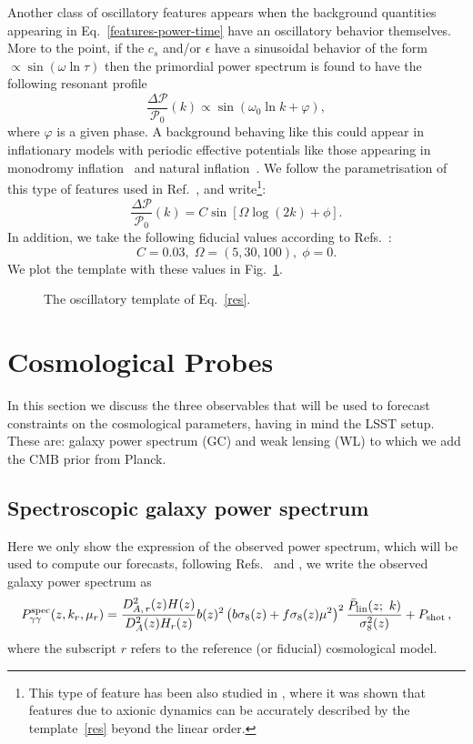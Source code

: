 \documentclass[12pt]{article}
\newcommand{\be}{\begin{equation}}
\newcommand{\ee}{\end{equation}}
\begin{document}
Another class of oscillatory features appears when the background quantities appearing in Eq.~\eqref{features-power-time} have an oscillatory behavior themselves. More to the point, if the $c_s$ and/or $\epsilon$ have a sinusoidal behavior of the form $\propto \sin (\omega \ln \tau)$ then the primordial power spectrum is found to have the following resonant profile
\be
\frac{\Delta \mathcal P}{\mathcal P_0 } (k)  \propto  \sin ( \omega_0 \ln k + \varphi ) ,
\ee
where $\varphi$ is a given phase. A background behaving like this could appear in inflationary models with periodic effective potentials like those appearing in monodromy inflation~\cite{McAllister:2008hb} and natural inflation~\cite{Freese:1990rb}. We follow the parametrisation of this type of features used in Ref.~\cite{Chen:2008wn}, and write\footnote{This type of feature has been also studied in \cite{Miranda:2015cea}, where it was shown that features due to axionic dynamics can be accurately described by the template~\eqref{res} beyond the linear order.}:
%
\be
\frac{\Delta \mathcal P}{\mathcal P_0 } (k) = C\sin\left[\Omega\log(2k)+\phi\right]. \label{res}
\ee
In addition, we take the following fiducial values according to Refs.~\cite{Chen:2016vvw,Ade:2015lrj}:
%
\be
C= 0.03, \; \Omega = (5,30,100), \; \phi= 0 \label{sinlog-fid}.
\ee
%
We plot the template with these values in Fig.~\ref{fig:template-V}.
%
\begin{figure}[h]
\centering
{}
\caption{The oscillatory template of Eq.~\eqref{res}.}
\label{fig:template-V}
\end{figure}
%


\setcounter{equation}{0} 
\section{Cosmological Probes} \label{s3:probes}

In this section we discuss the three observables that will be used to forecast constraints on the cosmological parameters, having in mind the LSST setup. These are: galaxy power spectrum (GC) and weak lensing (WL) to which we add the CMB prior from Planck. 



\subsection{Spectroscopic galaxy power spectrum}

Here we only show the expression of the observed power spectrum, which will be used  to compute our forecasts, following Refs.~\cite{SeoPU} and \cite{SaponeJN}, we write the observed galaxy power spectrum as
\be
P_{\gamma\gamma}^\mathrm{spec}(z,k_r,\mu_r) =
\frac{D_{A,\,r}^{2}(z)H(z)}{D_{A}^{2}(z)H_{r}(z)}b(z)^{2}\left(b\sigma_8(z)+f\sigma_8(z)\mu^{2}\right)^{2}\frac{\bar{P}_{\rm lin}(z;~k)}{\sigma^2_8(z)} +  P_\mathrm{shot} \,, \label{eq:pk}
\ee
where the subscript $r$ refers to the reference (or fiducial) cosmological model. 
\end{document}
